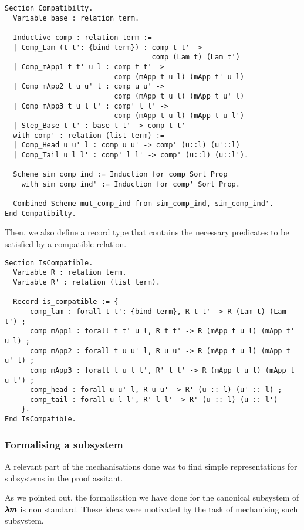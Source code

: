 \begin{lstlisting}[language=Coq]
Section Compatibilty.
  Variable base : relation term.
  
  Inductive comp : relation term :=
  | Comp_Lam (t t': {bind term}) : comp t t' ->
                                   comp (Lam t) (Lam t')
  | Comp_mApp1 t t' u l : comp t t' ->
                          comp (mApp t u l) (mApp t' u l)
  | Comp_mApp2 t u u' l : comp u u' ->
                          comp (mApp t u l) (mApp t u' l)
  | Comp_mApp3 t u l l' : comp' l l' ->
                          comp (mApp t u l) (mApp t u l')
  | Step_Base t t' : base t t' -> comp t t'
  with comp' : relation (list term) :=
  | Comp_Head u u' l : comp u u' -> comp' (u::l) (u'::l)
  | Comp_Tail u l l' : comp' l l' -> comp' (u::l) (u::l').

  Scheme sim_comp_ind := Induction for comp Sort Prop
    with sim_comp_ind' := Induction for comp' Sort Prop.

  Combined Scheme mut_comp_ind from sim_comp_ind, sim_comp_ind'.
End Compatibilty.
\end{lstlisting}

Then, we also define a record type that contains the necessary predicates to be satisfied by a compatible relation.

\begin{lstlisting}[language=Coq]
Section IsCompatible.
  Variable R : relation term.
  Variable R' : relation (list term).

  Record is_compatible := {
      comp_lam : forall t t': {bind term}, R t t' -> R (Lam t) (Lam t') ;
      comp_mApp1 : forall t t' u l, R t t' -> R (mApp t u l) (mApp t' u l) ;
      comp_mApp2 : forall t u u' l, R u u' -> R (mApp t u l) (mApp t u' l) ;
      comp_mApp3 : forall t u l l', R' l l' -> R (mApp t u l) (mApp t u l') ;
      comp_head : forall u u' l, R u u' -> R' (u :: l) (u' :: l) ;
      comp_tail : forall u l l', R' l l' -> R' (u :: l) (u :: l')
    }.
End IsCompatible.
\end{lstlisting}

\subsubsection{Formalising a subsystem}

A relevant part of the mechanisations done was to find simple representations for subsystems in the proof assitant.

As we pointed out, the formalisation we have done for the canonical subsystem of $\pmb{\lambda m}$ is non standard.
These ideas were motivated by the task of mechanising such subsystem.

